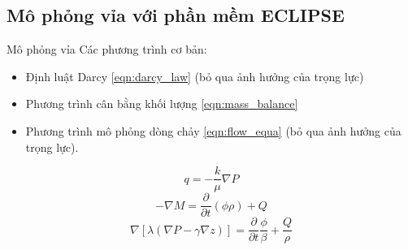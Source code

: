 \documentclass[11pt]{beamer}
\begin{document}
\subsection{Mô phỏng vỉa với phần mềm ECLIPSE	}
\begin{frame}{Mô phỏng vỉa}
Các phương trình cơ bản:
	\begin{itemize}
		\item Định luật Darcy \eqref{eqn:darcy_law} (bỏ qua ảnh hưởng của trọng lực)
		\item Phương trình cân bằng khối lượng \eqref{eqn:mass_balance}
		\item Phương trình mô phỏng dòng chảy \eqref{eqn:flow_equa} (bỏ qua ảnh hưởng của trọng lực).
	\end{itemize}
	\begin{equation}\label{eqn:darcy_law}
		q = -\dfrac{k}{\mu}\nabla{P}
	\end{equation}
	\begin{equation}\label{eqn:mass_balance}
		-\nabla{M}=\dfrac{\partial}{\partial t}(\phi\rho)+Q
	\end{equation}
	\begin{equation}\label{eqn:flow_equa}
		\nabla[\lambda(\nabla{P}-\gamma\nabla{z})]=\dfrac{\partial}{\partial{t}}\dfrac{\phi}{\beta}+\dfrac{Q}{\rho}
	\end{equation}
\end{frame}
\end{document}
